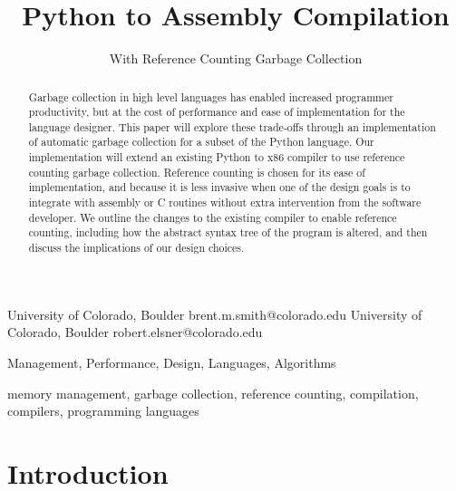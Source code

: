 \documentclass{sigplanconf}
\begin{document}
\copyrightdata{[to be supplied]} 


\title{Python to Assembly Compilation}
\subtitle{With Reference Counting Garbage Collection}

           {University of Colorado, Boulder}
           {brent.m.smith@colorado.edu}
           {University of Colorado, Boulder}
           {robert.elsner@colorado.edu}

\maketitle

\begin{abstract}
Garbage collection in high level languages has enabled increased programmer productivity, but at the cost of performance and ease of implementation for the language designer.  This paper will explore these trade-offs through an implementation of automatic garbage collection for a subset of the Python language.   Our implementation will extend an existing Python to x86 compiler to use reference counting garbage collection.  Reference counting is chosen for its ease of implementation, and because it is less invasive when one of the design goals is to integrate with assembly or C routines without extra intervention from the software developer.  We outline the changes to the existing compiler to enable reference counting, including how the abstract syntax tree of the program is altered, and then discuss the implications of our design choices.
\end{abstract}


\terms
Management, Performance, Design, Languages, Algorithms

\keywords
memory management, garbage collection, reference counting, compilation, compilers, programming languages

\section{Introduction}
\end{document}
